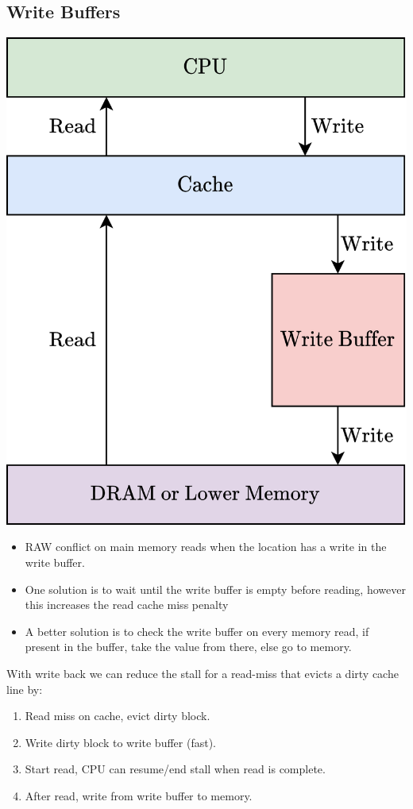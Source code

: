 \subsection{Write Buffers}
\begin{minipage}{.4\textwidth}
    \includegraphics[width=.9\textwidth]{caches/images/write_buffer.drawio.png}
\end{minipage}
\begin{minipage}{.6\textwidth}
    \begin{itemize}
        \item RAW conflict on main memory reads when the location has a write in the write buffer.
        \item One solution is to wait until the write buffer is empty before reading, however this increases the read cache miss penalty
        \item A better solution is to check the write buffer on every memory read, if present in the buffer, take the value from there, else go to memory. 
    \end{itemize}

    With write back we can reduce the stall for a read-miss that evicts a dirty cache line by:
    \begin{enumerate}
        \item Read miss on cache, evict dirty block.
        \item Write dirty block to write buffer (fast).
        \item Start read, CPU can resume/end stall when read is complete.
        \item After read, write from write buffer to memory.
    \end{enumerate}
\end{minipage}
\vspace{5mm}

